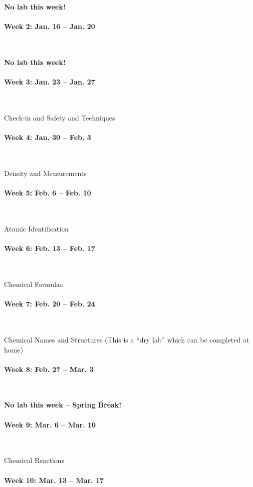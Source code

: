 \documentclass[12pt, letterpaper]{article}
\begin{document}
\textbf{No lab this week!}

\paragraph{Week 2: Jan. 16 -- Jan. 20}~

\textbf{No lab this week!}

\paragraph{Week 3: Jan. 23 -- Jan. 27}~

Check-in and Safety and Techniques

\paragraph{Week 4: Jan. 30 -- Feb. 3}~

Density and Measurements

\paragraph{Week 5: Feb. 6 -- Feb. 10}~

Atomic Identification

\paragraph{Week 6: Feb. 13 -- Feb. 17}~

Chemical Formulas

\paragraph{Week 7: Feb. 20 -- Feb. 24}~

Chemical Names and Structures (This is a ``dry lab'' which can be completed at home)

\paragraph{Week 8: Feb. 27 -- Mar. 3}~

\textbf{No lab this week -- Spring Break!}

\paragraph{Week 9: Mar. 6 -- Mar. 10}~

Chemical Reactions

\paragraph{Week 10: Mar. 13 -- Mar. 17}~
\end{document}
